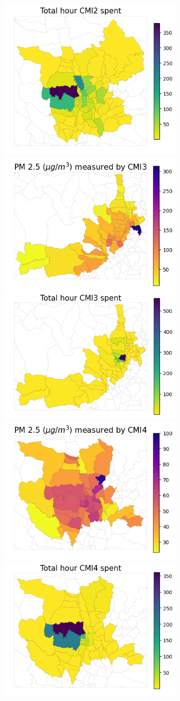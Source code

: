 \begin{figure}
\begin{subfigure}[t]{0.49\textwidth}
        \includegraphics[width=.49\linewidth]{figures/map/CMI2_time.png}
        \includegraphics[width=.49\linewidth]{figures/map/CMI3_PM25.png}%
        \includegraphics[width=.49\linewidth]{figures/map/CMI3_time.png}
        \includegraphics[width=.49\linewidth]{figures/map/CMI4_PM25.png}%
        \includegraphics[width=.49\linewidth]{figures/map/CMI4_time.png}

\end{subfigure}
\end{figure}
